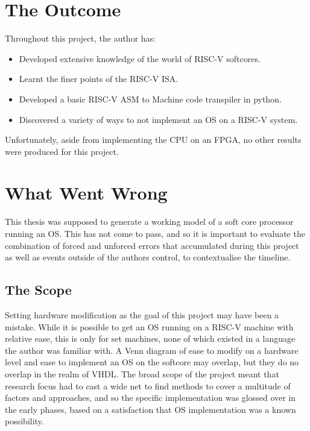 \section{The Outcome}
	Throughout this project, the author has:
	\begin{itemize}
		\item Developed extensive knowledge of the world of RISC-V softcores.
		\item Learnt the finer points of the RISC-V ISA.
		\item Developed a basic RISC-V ASM to Machine code transpiler in python.
		\item Discovered a variety of ways to not implement an OS on a RISC-V system.
	\end{itemize}

	Unfortunately, aside from implementing the CPU on an FPGA, no other results were produced for this project.
	
\section{What Went Wrong}
	This thesis was supposed to generate a working model of a soft core processor running an OS. This has not come to pass, and so it is important to evaluate the combination of forced and unforced errors that accumulated during this project as well as events outside of the authors control, to contextualise the timeline.
		
	\subsection{The Scope}
		Setting hardware modification as the goal of this project may have been a mistake. While it is possible to get an OS running on a RISC-V machine with relative ease, this is only for set machines, none of which existed in a language the author was familiar with. A Venn diagram of ease to modify on a hardware level and ease to implement an OS on the softcore may overlap, but they do no overlap in the realm of VHDL. The broad scope of the project meant that research focus had to cast a wide net to find methods to cover a multitude of factors and approaches, and so the specific implementation was glossed over in the early phases, based on a satisfaction that OS implementation was a known possibility.
		
